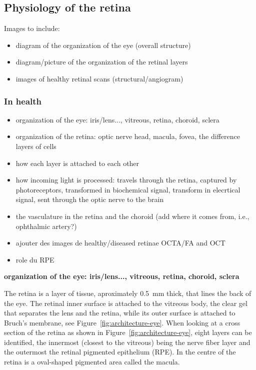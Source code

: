 \documentclass[12pt,a4paper]{journal}
\begin{document}
\subsection{Physiology of the retina}

Images to include:
\begin{itemize}
\item diagram of the organization of the eye (overall structure)
\item diagram/picture of the organization of the retinal layers
\item images of healthy retinal scans (structural/angiogram)
\end{itemize}


\subsubsection{In health}

\begin{itemize}
\item organization of the eye: iris/lens..., vitreous, retina, choroid, sclera
\item organization of the retina: optic nerve head, macula, fovea, the difference layers of cells
\item how each layer is attached to each other
\item how incoming light is processed: travels through the retina, captured by photoreceptors, transformed in biochemical signal, transform in elecrtical signal, sent through the optic nerve to the brain
\item the vasculature in the retina and the choroid (add where it comes from, i.e., ophthalmic artery?)
\item ajouter des images de healthy/diseased retinae OCTA/FA and OCT
\item role du RPE
\end{itemize}

\large\textbf{organization of the eye: iris/lens..., vitreous, retina, choroid, sclera}

The retina is a layer of tissue, aproximately \SI{0.5}{\mm} thick, that lines the back of the eye.
The retinal inner surface is attached to the vitreous body, the clear gel that separates the lens and the retina, while its outer surface is attached to Bruch's membrane, see Figure~\ref{fig:architecture-eye}.
When looking at a cross section of the retina as shown in Figure~\ref{fig:architecture-eye}, eight layers can be identified, the innermost (closest to the vitreous) being the nerve fiber layer and the outermost the retinal pigmented epithelium (RPE).
In the centre of the retina is a oval-shaped pigmented area called the macula.
\end{document}
